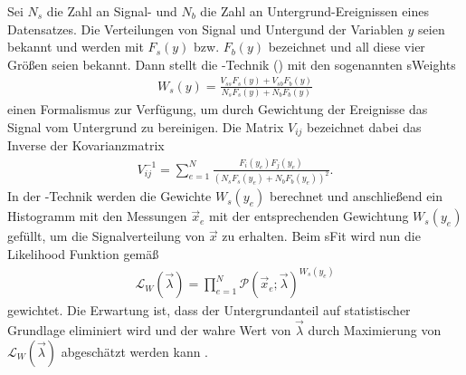Sei $N_s$ die Zahl an Signal- und $N_b$ die Zahl an Untergrund-Ereignissen eines Datensatzes. Die Verteilungen von Signal und Untergund der Variablen $y$ seien bekannt und werden mit $F_s(y)$ bzw. $F_b(y)$ bezeichnet und all diese vier Größen seien bekannt. Dann stellt die \SPlot-Technik (\cite{splot}) mit den sogenannten \glqq sWeights\grqq 
\begin{align}
W_s(y) = \frac{V_{ss}F_s(y)+V_{sb}F_b(y)}{N_sF_s(y)+N_bF_b(y)}
\end{align} 
einen Formalismus zur Verfügung, um durch Gewichtung der Ereignisse das Signal vom Untergrund zu bereinigen. Die Matrix $V_{ij}$ bezeichnet dabei das Inverse der Kovarianzmatrix
\begin{align}
V_{ij}^{-1} = \sum_{e=1}^N \frac{F_i(y_e)F_j(y_e)}{(N_sF_s(y_e)+N_bF_b(y_e))^2}.
\end{align}
In der \SPlot-Technik werden die Gewichte $W_s(y_e)$ berechnet und anschließend ein Histogramm mit den Messungen $\vec{x}_e$ mit der entsprechenden Gewichtung $W_s(y_e)$ gefüllt, um die Signalverteilung von $\vec{x}$ zu erhalten. Beim sFit wird nun die Likelihood Funktion gemäß
\begin{align}
\mathcal{L}_W(\vec{\lambda}) = \prod_{e=1}^N \mathcal{P}(\vec{x}_e;\vec{\lambda})^{W_s(y_e)}
\end{align}
gewichtet. Die Erwartung ist, dass der Untergrundanteil auf statistischer Grundlage eliminiert wird und der wahre Wert von $\vec{\lambda}$ durch Maximierung von $\mathcal{L}_W(\vec{\lambda})$ abgeschätzt werden kann \cite{sfit}.


